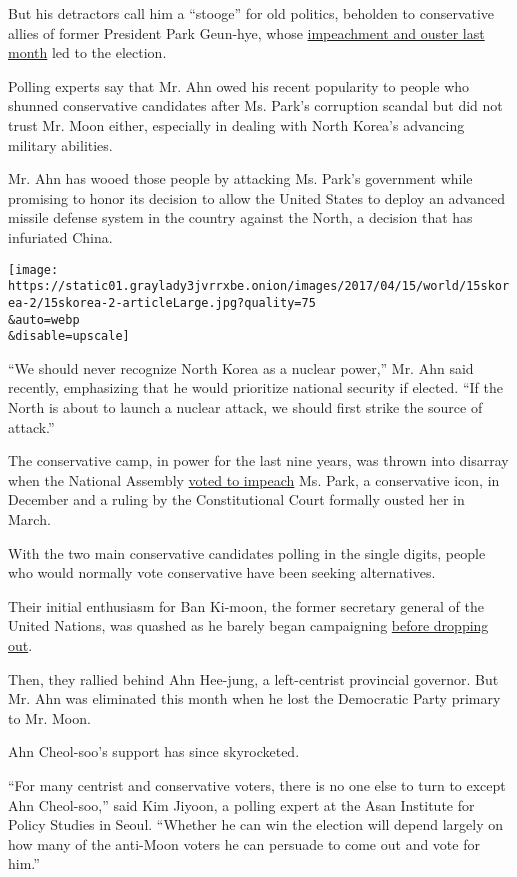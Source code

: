 But his detractors call him a ``stooge'' for old politics, beholden to
conservative allies of former President Park Geun-hye, whose
\href{https://www.nytimes3xbfgragh.onion/2017/03/09/world/asia/park-geun-hye-impeached-south-korea.html}{impeachment
and ouster last month} led to the election.

Polling experts say that Mr. Ahn owed his recent popularity to people
who shunned conservative candidates after Ms. Park's corruption scandal
but did not trust Mr. Moon either, especially in dealing with North
Korea's advancing military abilities.

Mr. Ahn has wooed those people by attacking Ms. Park's government while
promising to honor its decision to allow the United States to deploy an
advanced missile defense system in the country against the North, a
decision that has infuriated China.

\texttt{[image: https://static01.graylady3jvrrxbe.onion/images/2017/04/15/world/15skorea-2/15skorea-2-articleLarge.jpg?quality=75\\\&auto=webp\\\&disable=upscale]}

``We should never recognize North Korea as a nuclear power,'' Mr. Ahn
said recently, emphasizing that he would prioritize national security if
elected. ``If the North is about to launch a nuclear attack, we should
first strike the source of attack.''

The conservative camp, in power for the last nine years, was thrown into
disarray when the National Assembly
\href{https://www.nytimes3xbfgragh.onion/2016/12/09/world/asia/south-korea-president-park-geun-hye-impeached.html}{voted
to impeach} Ms. Park, a conservative icon, in December and a ruling by
the Constitutional Court formally ousted her in March.

With the two main conservative candidates polling in the single digits,
people who would normally vote conservative have been seeking
alternatives.

Their initial enthusiasm for Ban Ki-moon, the former secretary general
of the United Nations, was quashed as he barely began campaigning
\href{https://www.nytimes3xbfgragh.onion/2017/02/01/world/asia/ban-ki-moon-president-south-korea.html}{before
dropping out}.

Then, they rallied behind Ahn Hee-jung, a left-centrist provincial
governor. But Mr. Ahn was eliminated this month when he lost the
Democratic Party primary to Mr. Moon.

Ahn Cheol-soo's support has since skyrocketed.

``For many centrist and conservative voters, there is no one else to
turn to except Ahn Cheol-soo,'' said Kim Jiyoon, a polling expert at the
Asan Institute for Policy Studies in Seoul. ``Whether he can win the
election will depend largely on how many of the anti-Moon voters he can
persuade to come out and vote for him.''

